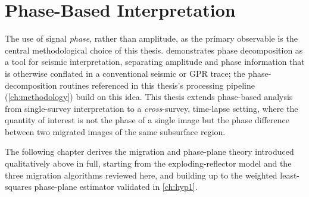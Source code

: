 \section{Phase-Based Interpretation}

The use of signal \emph{phase}, rather than amplitude, as the primary
observable is the central methodological choice of this thesis.
\citet{castagna2016} demonstrates phase decomposition as a tool for
seismic interpretation, separating amplitude and phase information that is
otherwise conflated in a conventional seismic or GPR trace; the
phase-decomposition routines referenced in this thesis's processing pipeline
(\cref{ch:methodology}) build on this idea. This thesis extends phase-based
analysis from single-survey interpretation to a \emph{cross}-survey,
time-lapse setting, where the quantity of interest is not the phase of a
single image but the phase difference between two migrated images of the
same subsurface region.

\bigskip
\noindent The following chapter derives the migration and phase-plane theory
introduced qualitatively above in full, starting from the exploding-reflector
model and the three migration algorithms reviewed here, and building up to
the weighted least-squares phase-plane estimator validated in
\cref{ch:hyp1}.

